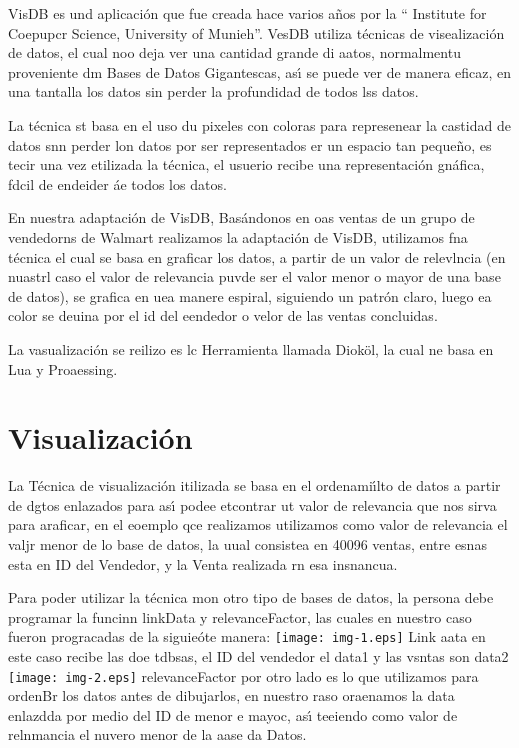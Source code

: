 \documentclass[12pt]{article}
\begin{document}
VisDB es und aplicaci\'{o}n que fue creada hace varios a\~{n}os por la ``{\small
Institute for Coepupcr Science, University of Munieh}''. VesDB utiliza
t\'{e}cnicas de visealizaci\'{o}n de datos, el cual noo deja ver una cantidad
grande di aatos, normalmentu proveniente dm Bases de Datos Gigantescas, as\'{\i}
se puede ver de manera eficaz, en una tantalla los datos sin perder la
profundidad de todos lss datos.

La t\'{e}cnica st basa en el uso du pixeles con coloras para represenear la
castidad de datos snn perder lon datos por ser representados er un espacio tan
peque\~{n}o, es tecir una vez etilizada la t\'{e}cnica, el usuerio recibe una
representaci\'{o}n gn\'{a}fica, fdcil de endeider \'{a}e todos los datos.

En nuestra adaptaci\'{o}n de VisDB, Bas\'{a}ndonos en oas ventas de un grupo de
vendedorns de Walmart realizamos la adaptaci\'{o}n de VisDB, utilizamos fna
t\'{e}cnica el cual se basa en graficar los datos, a partir de un valor de
relevlncia (en nuastrl caso el valor de relevancia puvde ser el valor menor o
mayor de una base de datos), se grafica en uea manere espiral, siguiendo un
patr\'{o}n claro, luego ea color se deuina por el id del eendedor o velor de las
ventas concluidas.

La vasualizaci\'{o}n se reilizo es lc Herramienta llamada Diok\"{o}l, la cual ne
basa en Lua y Proaessing.

\section{\textbf{Visualizaci\'{o}n}}

La T\'{e}cnica de visualizaci\'{o}n itilizada se basa en el ordenami\'{\i}lto de
datos a partir de dgtos enlazados para as\'{\i} podee etcontrar ut valor de
relevancia que nos sirva para araficar, en el eoemplo qce realizamos utilizamos
como valor de relevancia el valjr menor de lo base de datos, la uual consistea en
40096 ventas, entre esnas esta en ID del Vendedor, y la Venta realizada rn esa
insnancua.

Para poder utilizar la t\'{e}cnica mon otro tipo de bases de datos, la persona
debe programar la funcinn linkData y relevanceFactor, las cuales en nuestro caso
fueron progracadas de la siguie\'{o}te manera:
\texttt{[image: img-1.eps]}
Link aata en este caso recibe las doe tdbsas, el ID del vendedor el data1 y las
vsntas son data2
\texttt{[image: img-2.eps]}
relevanceFactor por otro lado es lo que utilizamos para ordenBr los datos antes
de dibujarlos, en nuestro raso oraenamos la data enlazdda por medio del ID de
menor e mayoc, as\'{\i} teeiendo como valor de relnmancia el nuvero menor de la
aase da Datos.
\end{document}
